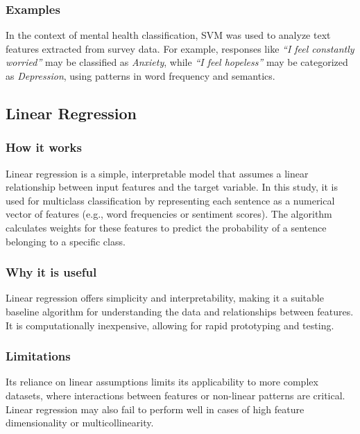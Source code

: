 \documentclass[runningheads,a4paper,11pt]{report}
\begin{document}
\subsubsection{Examples}
\label{subsubsection:svm_examples}

In the context of mental health classification, SVM was used to analyze text features extracted from survey data. For example, responses like \textit{``I feel constantly worried''} may be classified as \textit{Anxiety}, while \textit{``I feel hopeless''} may be categorized as \textit{Depression}, using patterns in word frequency and semantics.

\subsection{Linear Regression}
\label{subsection:linear_regression}

\subsubsection{How it works}
\label{subsubsection:linear_regression_how_it_works}

Linear regression is a simple, interpretable model that assumes a linear relationship between input features and the target variable. In this study, it is used for multiclass classification by representing each sentence as a numerical vector of features (e.g., word frequencies or sentiment scores). The algorithm calculates weights for these features to predict the probability of a sentence belonging to a specific class.

\subsubsection{Why it is useful}
\label{subsubsection:linear_regression_why_useful}

Linear regression offers simplicity and interpretability, making it a suitable baseline algorithm for understanding the data and relationships between features. It is computationally inexpensive, allowing for rapid prototyping and testing.

\subsubsection{Limitations}
\label{subsubsection:linear_regression_limitations}

Its reliance on linear assumptions limits its applicability to more complex datasets, where interactions between features or non-linear patterns are critical. Linear regression may also fail to perform well in cases of high feature dimensionality or multicollinearity.
\end{document}
